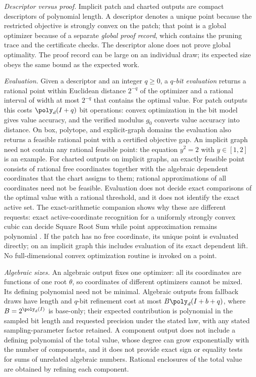 \emph{Descriptor versus proof.} Implicit patch and charted outputs are
compact descriptors of polynomial length. A descriptor denotes a unique
point because the restricted objective is strongly convex on the patch;
that point is a global optimizer because of a separate \emph{global proof
record}, which contains the pruning trace and the certificate checks. The
descriptor alone does not prove global optimality. The proof record can be
large on an individual draw; its expected size obeys the same bound as the
expected work.

\emph{Evaluation.} Given a descriptor and an integer $q\ge0$, a
\emph{$q$-bit evaluation} returns a rational point within Euclidean distance $2^{-q}$
of the optimizer and a rational interval of width at most $2^{-q}$ that
contains the optimal value. For patch outputs this costs $\poly_d(I+q)$ bit
operations: convex optimization in the bit model gives value accuracy, and
the verified modulus $g_0$ converts value accuracy into distance. On box,
polytope, and explicit-graph domains the evaluation also returns a feasible
rational point with a certified objective gap. An implicit graph need not
contain any rational feasible point: the equation $y^2=2$ with $y\in[1,2]$
is an example. For charted outputs on implicit graphs, an exactly feasible
point consists of rational free coordinates together with the algebraic
dependent coordinates that the chart assigns to them; rational
approximations of all coordinates need not be feasible. Evaluation does not
decide exact comparisons of the optimal value with a rational threshold,
and it does not identify the exact active set.
The exact-arithmetic companion shows why these are different requests:
exact active-coordinate recognition for a uniformly strongly convex cubic
can decide Square Root Sum while point approximation remains polynomial
\citep{companion-exact-arithmetic}.
If the patch has no free coordinate, its unique point is evaluated directly;
on an implicit graph this includes evaluation of its exact dependent lift.
No full-dimensional convex optimization routine is invoked on a point.

\emph{Algebraic sizes.} An algebraic output fixes one optimizer: all its
coordinates are functions of one root $\theta$, so coordinates of different
optimizers cannot be mixed. Its defining polynomial need not be minimal.
Algebraic outputs from fallback draws have length and $q$-bit refinement cost
at most $B\poly_d(I+b+q)$, where $B=2^{\poly_d(I)}$ is base-only; their
expected contribution is polynomial in the sampled bit length and requested
precision under the stated law, with any stated sampling-parameter factor
retained. A component output does not include a
defining polynomial of the total value, whose degree can grow exponentially
with the number of components, and it does not provide exact sign or
equality tests for sums of unrelated algebraic numbers. Rational
enclosures of the total value are obtained by refining each component.

